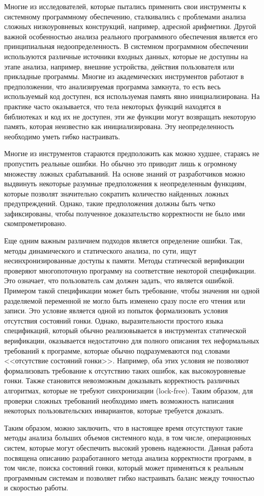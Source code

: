 Многие из исследователей, которые пытались применить свои инструменты к системному программному обеспечению, сталкивались с проблемами анализа сложных низкоуровневых конструкций, например, адресной арифметики.
Другой важной особенностью анализа реального программного обеспечения является его принципиальная недоопределенность.
В системном программном обеспечении используются различные источники входных данных, которые не доступны на этапе анализа, например, внешние устройства, действия пользователя или прикладные программы. 
Многие из академических инструментов работают в предположении, что анализируемая программа замкнута, то есть весь используемый код доступен, вся используемая память явно инициализирована.
На практике часто оказывается, что тела некоторых функций находятся в библиотеках и код их не доступен, эти же функции могут возвращать некоторую память, которая неизвестно как инициализирована.
Эту неопределенность необходимо уметь гибко настраивать. 

Многие из инструментов стараются предположить как можно худшее, стараясь не пропустить реальные ошибки.
Но обычно это приводит лишь к огромному множеству ложных срабатываний.
На основе знаний от разработчиков можно выдвинуть некоторые разумные предположения к неопределенным функциям, которые позволят значительно сократить количество найденных ложных предупреждений.
Однако, такие предположения должны быть четко зафиксированы, чтобы полученное доказательство корректности не было ими скомпрометировано.

Еще одним важным различием подходов является определение ошибки. 
Так, методы динамического и статического анализа, по сути, ищут несинхронизированные доступы к памяти.
Методы статической верификации проверяют многопоточную программу на соответствие некоторой спецификации.
Это означает, что пользователь сам должен задать, что является ошибкой.
Примером такой спецификации может быть требование, чтобы значения ни одной разделяемой переменной не могло быть изменено сразу после его чтения или записи.
Это условие является одной из попыток формализовать условия отсутствия состояний гонки.
Однако, выразительности простого языка спецификаций, который обычно реализовывается в инструментах статической верификации, оказывается недостаточно для полного описания тех неформальных требований к программе, которые обычно подразумеваются под словами <<отсутствие состояний гонки>>.
Например, оба этих условия не позволяют формализовать требование к отсутствию таких ошибок, как высокоуровневые гонки.
Также становится невозможным доказывать корректность различных алгоритмах, которые не требуют синхронизации (lock-free).
Таким образом, для проверки сложных требований необходимо иметь возможность написания некоторых пользовательских инвариантов, которые требуется доказать.

Таким образом, можно заключить, что в настоящее время отсутствуют такие методы анализа больших объемов системного кода, в том числе, операционных систем, которые могут обеспечить высокий уровень надежности.
Данная работа посвящена описанию разработанного метода анализа корректности программ, в том числе, поиска состояний гонки, который может применяться к реальным программным системам и позволяет гибко настраивать баланс между точностью и скоростью работы.
